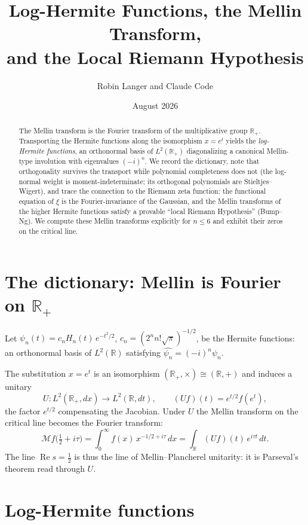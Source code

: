 \documentclass[11pt]{article}
\title{Log-Hermite Functions, the Mellin Transform,\\ and the Local Riemann Hypothesis}
\author{Robin Langer and Claude Code}
\date{August 2026}
\theoremstyle{remark}
\newcommand{\R}{\mathbb{R}}
\newcommand{\M}{\mathcal{M}}
\begin{document}
\maketitle

\begin{abstract}
The Mellin transform is the Fourier transform of the multiplicative group $\R_+$. Transporting the Hermite functions along the isomorphism $x = e^t$ yields the \emph{log-Hermite functions}, an orthonormal basis of $L^2(\R_+)$ diagonalizing a canonical Mellin-type involution with eigenvalues $(-i)^n$. We record the dictionary, note that orthogonality survives the transport while polynomial completeness does not (the log-normal weight is moment-indeterminate; its orthogonal polynomials are Stieltjes--Wigert), and trace the connection to the Riemann zeta function: the functional equation of $\xi$ is the Fourier-invariance of the Gaussian, and the Mellin transforms of the higher Hermite functions satisfy a provable ``local Riemann Hypothesis'' (Bump--Ng). We compute these Mellin transforms explicitly for $n \le 6$ and exhibit their zeros on the critical line.
\end{abstract}

\section{The dictionary: Mellin is Fourier on $\R_+$}

Let $\psi_n(t) = c_n H_n(t)\,e^{-t^2/2}$, $c_n = (2^n n! \sqrt{\pi})^{-1/2}$, be the Hermite functions: an orthonormal basis of $L^2(\R)$ satisfying $\widehat{\psi_n} = (-i)^n \psi_n$.

The substitution $x = e^t$ is an isomorphism $(\R_+,\times) \cong (\R,+)$ and induces a unitary
\begin{equation}
U : L^2(\R_+, dx) \to L^2(\R, dt), \qquad (Uf)(t) = e^{t/2} f(e^t),
\end{equation}
the factor $e^{t/2}$ compensating the Jacobian. Under $U$ the Mellin transform on the critical line becomes the Fourier transform:
\begin{equation}
\M f\bigl(\tfrac12 + i\tau\bigr) = \int_0^\infty f(x)\, x^{-1/2 + i\tau}\, dx
= \int_\R (Uf)(t)\, e^{i\tau t}\, dt.
\label{eq:mellin-fourier}
\end{equation}
The line $\operatorname{Re} s = \tfrac12$ is thus the line of Mellin--Plancherel unitarity: it is Parseval's theorem read through $U$.

\section{Log-Hermite functions}
\end{document}
